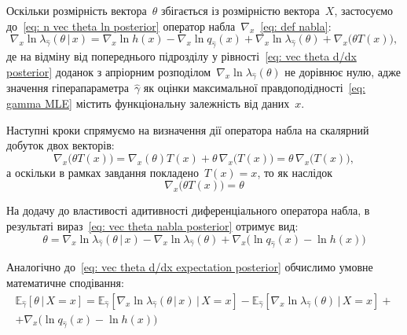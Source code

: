 \documentclass{mathreport}
\begin{document}
Оскільки розмірність вектора~$\theta$ збігається із розмірністю вектора~$X$, застосуємо до~\eqref{eq: n vec theta ln posterior} оператор набла~$\nabla_x$~\eqref{eq: def nabla}:
\begin{equation}\label{eq: vec theta nabla posterior}
    \nabla_x\ln{\lambda_{\widehat{\gamma}}(\theta \,|\, x)} = \nabla_x\ln{h(x)} - \nabla_x\ln{q_{\widehat{\gamma}}(x)} +  \nabla_x\ln{\lambda_{\widehat{\gamma}}(\theta)} + \nabla_x\bigl( \theta T(x) \bigr),
\end{equation}
де на відміну від попереднього підрозділу у рівності~\eqref{eq: vec theta d/dx posterior} доданок з апріорним розподілом~$\nabla_x\ln{\lambda_{\widehat{\gamma}}(\theta)}$ не дорівнює нулю, адже значення гіперапараметра~$\widehat{\gamma}$ як оцінки максимальної правдоподідності~\eqref{eq: gamma MLE} містить функціональну залежність від даних~$x$.

Наступні кроки спрямуємо на визначення дії оператора набла на скалярний добуток двох векторів:
\begin{equation}
    \nabla_x\bigl( \theta T(x) \bigr) = \nabla_x(\theta) T(x) + \theta\,\nabla_x\bigl( T(x) \bigr) = \theta\,\nabla_x\bigl( T(x) \bigr),
\end{equation}
а оскільки в рамках завдання покладено~$T(x)=x$, то як наслідок
\begin{equation}
    \nabla_x\bigl( \theta T(x) \bigr) = \theta
\end{equation}

На додачу до властивості адитивності диференціального оператора набла, в результаті вираз~\eqref{eq: vec theta nabla posterior} отримує вид:
\begin{equation}
    \theta = \nabla_x\ln{\lambda_{\widehat{\gamma}}(\theta \,|\, x)} - \nabla_x\ln{\lambda_{\widehat{\gamma}}(\theta)} + \nabla_x\bigl( \ln{q_{\widehat{\gamma}}(x)} - \ln{h(x)} \bigr)
\end{equation}

Аналогічно до~\eqref{eq: vec theta d/dx expectation posterior} обчислимо умовне математичне сподівання: 
\begin{multline}\label{eq: theta Bayes estimation}
    \mathbb{E}_{\widehat{\gamma}} \left[ \theta \,|\, X=x \right] = \mathbb{E}_{\widehat{\gamma}} \left[ \nabla_x\ln{\lambda_{\widehat{\gamma}}(\theta \,|\, x)} \,|\, X=x \right] - \mathbb{E}_{\widehat{\gamma}} \left[ \nabla_x\ln{\lambda_{\widehat{\gamma}}(\theta)} \,|\, X=x \right] + \\
    + \nabla_x\bigl( \ln{q_{\widehat{\gamma}}(x)} - \ln{h(x)} \bigr)
\end{multline}
\end{document}
